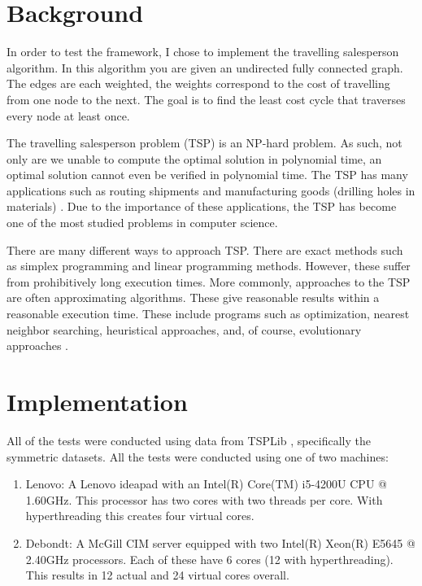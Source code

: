 \documentclass[10pt,letterpaper]{article}
\begin{document}
\section{Background}
In order to test the framework, I chose to implement the travelling salesperson algorithm. In this algorithm you are given an undirected fully connected graph. The edges are each weighted, the weights correspond to the cost of travelling from one node to the next. The goal is to find the least cost cycle that traverses every node at least once.

The travelling salesperson problem (TSP) is an NP-hard problem. As such, not only are we unable to compute the optimal solution in polynomial time, an optimal solution cannot even be verified in polynomial time. The TSP has many applications such as routing shipments and manufacturing goods (drilling holes in materials) \cite{tspuses}. Due to the importance of these applications, the TSP has become one of the most studied problems in computer science.

There are many different ways to approach TSP. There are exact methods such as simplex programming and linear programming methods. However, these suffer from prohibitively long execution times. More commonly, approaches to the TSP are often approximating algorithms. These give reasonable results within a reasonable execution time. These include programs such as optimization, nearest neighbor searching, heuristical approaches, and, of course, evolutionary approaches \cite{matai2010traveling}.


\section{Implementation} \label{sec:implementation}
All of the tests were conducted using data from TSPLib \cite{tsplib}, specifically the symmetric datasets. All the tests were conducted using one of two machines:
\begin{enumerate}
\item Lenovo: A Lenovo ideapad with an Intel(R) Core(TM) i5-4200U CPU @ 1.60GHz. This processor has two cores with two threads per core. With hyperthreading this creates four virtual cores.
\item Debondt: A McGill CIM server equipped with two Intel(R) Xeon(R) E5645 @ 2.40GHz processors. Each of these have 6 cores (12 with hyperthreading). This results in 12 actual and 24 virtual cores overall.
\end{enumerate}
\end{document}
